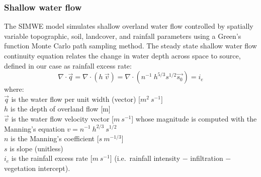 \documentclass[gmd, manuscript]{copernicus}
\begin{document}

\subsubsection{Shallow water flow}

The SIMWE model simulates shallow overland water flow
controlled by spatially variable topographic, soil, landcover, 
and rainfall parameters using a Green's function Monte Carlo path sampling method.
The steady state shallow water flow continuity equation relates the change in water depth across space 
to source, defined in our case as rainfall excess rate: 
\begin{equation}
\label{eq:water}
\nabla \cdot \vec{q} = \nabla \cdot (h~\vec{v}) = \nabla \cdot (n^{-1}~h^{5/3}s^{1/2}\vec{s_0}) = i_e
\end{equation}
{\small
\noindent
where: \\
\noindent
\hspace*{0.5em} $\vec{q}$ is the water flow per unit width (vector) [$\unit{m}^2~\unit{s}^{-1}$]\\
\hspace*{0.5em} $h$ is the depth of overland flow [\unit{m}]\\
\hspace*{0.5em} $\vec{v} $ is the water flow velocity vector [$\unit{m~s^{-1}}$]
whose magnitude is computed with the Manning's equation $v=n^{-1}~h^{2/3}~s^{1/2}$\\
\hspace*{0.5em} $n$ is the Manning's coefficient [$\unit{s~m^{-1/3}}$] \\
\hspace*{0.5em} $s$ is slope (unitless)\\
\hspace*{0.5em} $i_e$ is the rainfall excess rate [$\unit{m~s^{-1}}$]
(i.e.~rainfall intensity $-$ infiltration $-$ vegetation intercept).\\
}
\end{document}

